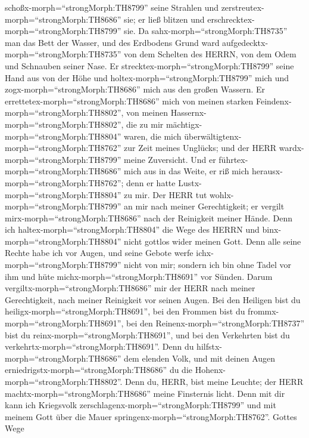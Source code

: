 schoßx-morph=``strongMorph:TH8799'' seine Strahlen und
zerstreutex-morph=``strongMorph:TH8686'' sie; er ließ blitzen und
erschrecktex-morph=``strongMorph:TH8799'' sie.  Da
sahx-morph=``strongMorph:TH8735'' man das Bett der Wasser, und des
Erdbodens Grund ward aufgedecktx-morph=``strongMorph:TH8735'' von dem
Schelten des HERRN, von dem Odem und Schnauben seiner Nase.
 Er strecktex-morph=``strongMorph:TH8799'' seine Hand aus
von der Höhe und holtex-morph=``strongMorph:TH8799'' mich und
zogx-morph=``strongMorph:TH8686'' mich aus den großen Wassern.
 Er errettetex-morph=``strongMorph:TH8686'' mich von meinen
starken Feindenx-morph=``strongMorph:TH8802'', von meinen
Hassernx-morph=``strongMorph:TH8802'', die zu mir
mächtigx-morph=``strongMorph:TH8804'' waren,  die mich
überwältigtenx-morph=``strongMorph:TH8762'' zur Zeit meines Unglücks;
und der HERR wardx-morph=``strongMorph:TH8799'' meine Zuversicht.
 Und er führtex-morph=``strongMorph:TH8686'' mich aus in
das Weite, er riß mich herausx-morph=``strongMorph:TH8762''; denn er
hatte Lustx-morph=``strongMorph:TH8804'' zu mir.  Der HERR
tut wohlx-morph=``strongMorph:TH8799'' an mir nach meiner Gerechtigkeit;
er vergilt mirx-morph=``strongMorph:TH8686'' nach der Reinigkeit meiner
Hände.  Denn ich haltex-morph=``strongMorph:TH8804'' die
Wege des HERRN und binx-morph=``strongMorph:TH8804'' nicht gottlos wider
meinen Gott.  Denn alle seine Rechte habe ich vor Augen,
und seine Gebote werfe ichx-morph=``strongMorph:TH8799'' nicht von mir;
 sondern ich bin ohne Tadel vor ihm und hüte
michx-morph=``strongMorph:TH8691'' vor Sünden.  Darum
vergiltx-morph=``strongMorph:TH8686'' mir der HERR nach meiner
Gerechtigkeit, nach meiner Reinigkeit vor seinen Augen. 
Bei den Heiligen bist du heiligx-morph=``strongMorph:TH8691'', bei den
Frommen bist du frommx-morph=``strongMorph:TH8691'',  bei
den Reinenx-morph=``strongMorph:TH8737'' bist du
reinx-morph=``strongMorph:TH8691'', und bei den Verkehrten bist du
verkehrtx-morph=``strongMorph:TH8691''.  Denn du
hilfstx-morph=``strongMorph:TH8686'' dem elenden Volk, und mit deinen
Augen erniedrigstx-morph=``strongMorph:TH8686'' du die
Hohenx-morph=``strongMorph:TH8802''.  Denn du, HERR, bist
meine Leuchte; der HERR machtx-morph=``strongMorph:TH8686'' meine
Finsternis licht.  Denn mit dir kann ich Kriegsvolk
zerschlagenx-morph=``strongMorph:TH8799'' und mit meinem Gott über die
Mauer springenx-morph=``strongMorph:TH8762''.  Gottes Wege
